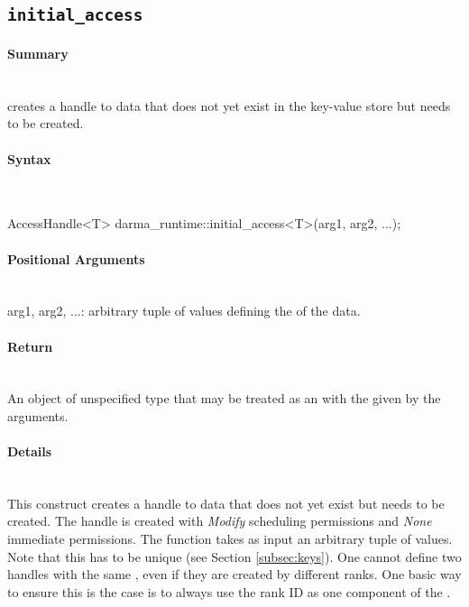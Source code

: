 \subsection{\texttt{initial\_access}}

\paragraph{Summary}\mbox{}\\ 
 creates a \gls{handle} to data that does not yet
exist in the \gls{key-value store} but needs to be created.

\paragraph{Syntax}\mbox{}\\ 
\begin{CppCode}
AccessHandle<T> darma_runtime::initial_access<T>(arg1, arg2, ...);
\end{CppCode}

\paragraph{Positional Arguments}\mbox{}\\ 
arg1, arg2, ...: arbitrary \gls{tuple} of values defining the  of the data.

\paragraph{Return}\mbox{}\\ 
An object of unspecified type that may be treated as an 
with the  given by the arguments.

\paragraph{Details}\mbox{}\\ 
This construct creates a \gls{handle} to data that does not yet 
exist but needs to be created.  The \gls{handle} is created with {\it Modify}
\gls{scheduling permissions} and {\it None} \gls{immediate permissions}.  The function takes
as input an arbitrary \gls{tuple} of values.
Note that this  has to be unique (see Section \ref{subsec:keys}).
One cannot define two \glspl{handle} with the same , even if they
are created by different \glspl{rank}.
One basic way to ensure this is the case is to always use the \gls{rank} ID
as one component of the . 

